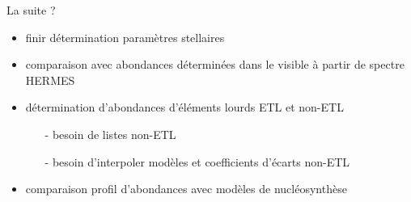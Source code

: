 \documentclass[10pt]{beamer}
\begin{document}
\begin{frame}[fragile]{La suite ?}
    \begin{itemize}
        \item finir détermination paramètres stellaires
        \item comparaison avec abondances déterminées dans le visible à partir de spectre HERMES
        \item détermination  d'abondances d'éléments lourds ETL et non-ETL
        \begin{itemize}
            \item [-] besoin de listes non-ETL
            \item [-] besoin d'interpoler modèles et coefficients d'écarts non-ETL
        \end{itemize}
        \item comparaison profil d'abondances avec modèles de nucléosynthèse
    \end{itemize} 
\end{frame}








\end{document}
